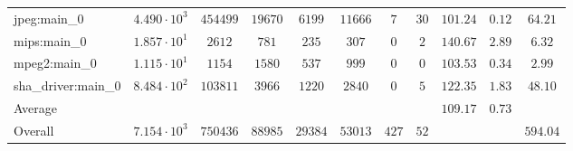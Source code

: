 \begin{tabular}{|l|c|c|c|c|c|c|c|c|c|c|}
jpeg:main\_0            & $ 4.490 \cdot 10^{3}  $ & $ 454499 $ & $ 19670 $ & $ 6199  $ & $ 11666 $ & $ 7   $ & $ 30 $ & $ 101.24      $ & $ 0.12    $ & $ 64.21   $ \\
mips:main\_0            & $ 1.857 \cdot 10^{1}  $ & $ 2612   $ & $ 781   $ & $ 235   $ & $ 307   $ & $ 0   $ & $ 2  $ & $ 140.67      $ & $ 2.89    $ & $ 6.32    $ \\
mpeg2:main\_0           & $ 1.115 \cdot 10^{1}  $ & $ 1154   $ & $ 1580  $ & $ 537   $ & $ 999   $ & $ 0   $ & $ 0  $ & $ 103.53      $ & $ 0.34    $ & $ 2.99    $ \\
sha\_driver:main\_0     & $ 8.484 \cdot 10^{2}  $ & $ 103811 $ & $ 3966  $ & $ 1220  $ & $ 2840  $ & $ 0   $ & $ 5  $ & $ 122.35      $ & $ 1.83    $ & $ 48.10   $ \\
\hline
Average                 & $                     $ & $        $ & $       $ & $       $ & $       $ & $     $ & $    $ & $ 109.17      $ & $ 0.73    $ & $         $ \\
\hline
Overall                 & $ 7.154 \cdot 10^{3}  $ & $ 750436 $ & $ 88985 $ & $ 29384 $ & $ 53013 $ & $ 427 $ & $ 52 $ & $             $ & $         $ & $ 594.04  $ \\
\hline
\end{tabular}
